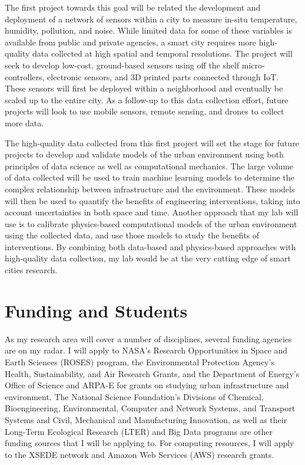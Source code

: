 \documentclass[12pt]{article}
\begin{document}
The first project towards this goal will be related the development and deployment of a network of sensors within a city to measure in-situ temperature, humidity, pollution, and noise. While limited data for some of these variables is available from public and private agencies, a smart city requires more high-quality data collected at high spatial and temporal resolutions. The project will seek to develop low-cost, ground-based sensors using off the shelf micro-controllers, electronic sensors, and 3D printed parts connected through IoT. These sensors will first be deployed within a neighborhood and eventually be scaled up to the entire city. As a follow-up to this data collection effort, future projects will look to use mobile sensors, remote sensing, and drones to collect more data.

The high-quality data collected from this first project will set the stage for future projects to develop and validate models of the urban environment using both principles of data science as well as computational mechanics. The large volume of data collected will be used to train machine learning models to determine the complex relationship between infrastructure and the environment. These models will then be used to quantify the benefits of engineering interventions, taking into account uncertainties in both space and time. Another approach that my lab will use is to calibrate physics-based computational models of the urban environment using the collected data, and use those models to study the benefits of interventions. By combining both data-based and physics-based approaches with high-quality data collection, my lab would be at the very cutting edge of smart cities research.

\section*{Funding and Students}
As my research area will cover a number of disciplines, several funding agencies are on my radar. I will apply to NASA's Research Opportunities in Space and Earth Sciences (ROSES) program, the Environmental Protection Agency's Health, Sustainability, and Air Research Grants, and the Department of Energy's Office of Science and ARPA-E for grants on studying urban infrastructure and environment. The National Science Foundation's Divisions of Chemical, Bioengineering, Environmental, Computer and Network Systems, and Transport Systems and Civil, Mechanical and Manufacturing Innovation, as well as their Long-Term Ecological Research (LTER) and Big Data programs are other funding sources that I will be applying to. For computing resources, I will apply to the XSEDE network and Amazon Web Services (AWS) research grants. 
\end{document}
